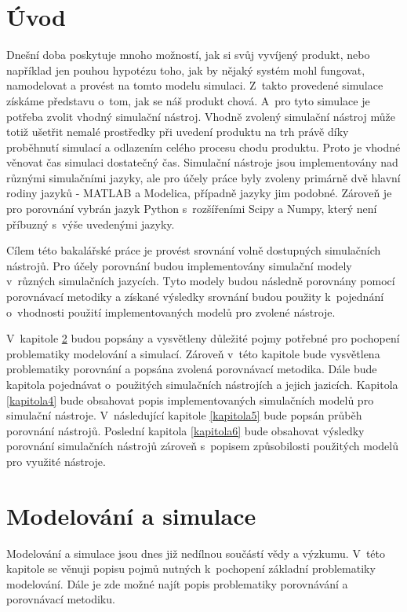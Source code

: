 \chapter{Úvod}

Dnešní doba poskytuje mnoho možností, jak si svůj vyvíjený produkt, nebo například jen pouhou hypotézu toho, jak by nějaký systém mohl fungovat, namodelovat a provést na tomto modelu simulaci. Z~takto provedené simulace získáme představu o~tom, jak se náš produkt chová. A~pro tyto simulace je potřeba zvolit vhodný simulační nástroj. Vhodně zvolený simulační nástroj může totiž ušetřit nemalé prostředky při uvedení produktu na trh právě díky proběhnutí simulací a odlazením celého procesu chodu produktu. Proto je vhodné věnovat čas simulaci dostatečný čas. Simulační nástroje jsou implementovány nad různými simulačními jazyky, ale pro účely práce byly zvoleny primárně dvě hlavní rodiny jazyků - MATLAB a Modelica, případně jazyky jim podobné. Zároveň je pro porovnání vybrán jazyk Python s~rozšířeními Scipy a Numpy, který není příbuzný s~výše uvedenými jazyky.

Cílem této bakalářské práce je provést srovnání volně dostupných simulačních nástrojů. Pro účely porovnání budou implementovány simulační modely v~různých simulačních jazycích. Tyto modely budou následně porovnány pomocí porovnávací metodiky a získané výsledky srovnání budou použity k~pojednání o~vhodnosti použití implementovaných modelů pro zvolené nástroje.

V~kapitole \ref{kapitola2} budou popsány a vysvětleny důležité pojmy potřebné pro pochopení problematiky modelování a simulací. Zároveň v~této kapitole bude vysvětlena problematiky porovnání a popsána zvolená porovnávací metodika. Dále bude kapitola pojednávat o~použitých simulačních nástrojích a jejich jazicích. Kapitola \ref{kapitola4} bude obsahovat popis implementovaných simulačních modelů pro simulační nástroje. V~následující kapitole \ref{kapitola5} bude popsán průběh porovnání nástrojů. Poslední kapitola \ref{kapitola6} bude obsahovat výsledky porovnání simulačních nástrojů zároveň s~popisem způsobilosti použitých modelů pro využité nástroje.

\chapter{Modelování a simulace}
\label{kapitola2}

Modelování a simulace jsou dnes již nedílnou součástí vědy a výzkumu. V~této kapitole se věnuji popisu pojmů nutných k~pochopení základní problematiky modelování. Dále je zde možné najít popis problematiky porovnávání a porovnávací metodiku.

